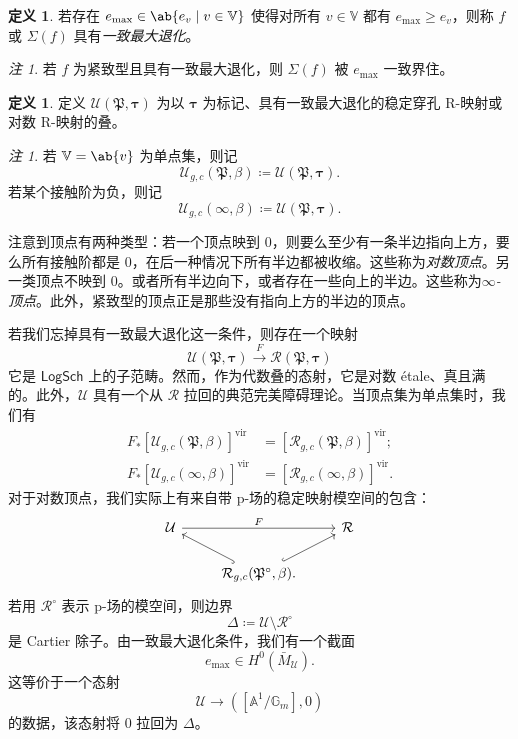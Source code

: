 \documentclass{amsart}
\theoremstyle{definition}
\newtheorem{defn}[thm]{定义}
\theoremstyle{remark}
\newtheorem{rmk}[thm]{注}
\theoremstyle{plain}
\theoremstyle{definition}
\theoremstyle{remark}
\newcommand{\A}{\mathbb{A}}
\newcommand{\G}{\mathbb{G}}
\newcommand{\V}{\mathbb{V}}
\newcommand{\mc}[1]{\mathcal{#1}}
\newcommand{\mf}[1]{\mathfrak{#1}}
\newcommand{\mr}[1]{\mathrm{#1}}
\newcommand{\ms}[1]{\mathsf{#1}}
\newcommand{\1}{\mathbf{1}}
\newcommand{\2}{\mathbf{2}}
\newcommand{\3}{\mathbf{3}}
\newcommand{\vir}{\mr{vir}}
\begin{document}
\begin{defn}
    若存在 \(e_{\max} \in \ab\{e_v \mid v \in \V \}\) 使得对所有 \(v \in \V\) 都有 \(e_{\max} \geq e_v\)，则称 \(f\) 或 \(\Sigma(f)\) 具有\textit{一致最大退化}。
\end{defn}

\begin{rmk}
    若 \(f\) 为紧致型且具有一致最大退化，则 \(\Sigma(f)\) 被 \(e_{\max}\) 一致界住。
\end{rmk}

\begin{defn}
    定义 \(\mc{U}(\mf{P}, \bm{\tau})\) 为以 \(\bm{\tau}\) 为标记、具有一致最大退化的稳定穿孔 R-映射或对数 R-映射的叠。
\end{defn}

\begin{rmk}
    若 \(\V = \ab\{v\}\) 为单点集，则记
    \[ \mc{U}_{g, c}(\mf{P}, \beta) \coloneqq \mc{U}(\mf{P}, \bm{\tau}). \]
    若某个接触阶为负，则记
    \[ \mc{U}_{g, c}(\infty, \beta) \coloneqq \mc{U}(\mf{P}, \bm{\tau}). \]
\end{rmk}

注意到顶点有两种类型：若一个顶点映到 \(0\)，则要么至少有一条半边指向上方，要么所有接触阶都是 \(0\)，在后一种情况下所有半边都被收缩。这些称为\textit{对数顶点}。另一类顶点不映到 \(0\)。或者所有半边向下，或者存在一些向上的半边。这些称为\textit{\(\infty\)-顶点}。此外，紧致型的顶点正是那些没有指向上方的半边的顶点。

若我们忘掉具有一致最大退化这一条件，则存在一个映射
\[ \mc{U}(\mf{P}, \bm{\tau}) \xrightarrow{F} \mc{R}(\mf{P}, \bm{\tau}) \]
它是 \(\ms{LogSch}\) 上的子范畴。然而，作为代数叠的态射，它是对数 \'etale、真且满的。此外，\(\mc{U}\) 具有一个从 \(\mc{R}\) 拉回的典范完美障碍理论。当顶点集为单点集时，我们有
\begin{align*}
    F_* [\mc{U}_{g, c}(\mf{P}, \beta)]^{\vir} &= [\mc{R}_{g, c}(\mf{P}, \beta)]^{\vir}; \\
    F_* [\mc{U}_{g, c}(\infty, \beta)]^{\vir} &= [\mc{R}_{g, c}(\infty, \beta)]^{\vir}.
\end{align*}
对于对数顶点，我们实际上有来自带 p-场的稳定映射模空间的包含：
\begin{equation*}
\begin{tikzcd}
    \mc{U} \ar{rr}{F} & & \mc{R} \\
    & \mc{R}_{g,c}(\mf{P}^{\circ}, \beta) \ar[hookrightarrow]{ul} \ar[hookrightarrow]{ur}.
\end{tikzcd}
\end{equation*}
若用 \(\mc{R}^{\circ}\) 表示 p-场的模空间，则边界
\[ \Delta \coloneqq \mc{U} \setminus \mc{R}^{\circ} \]
是 Cartier 除子。由一致最大退化条件，我们有一个截面
\[ e_{\max} \in H^0(\bar{M}_{\mc{U}}). \]
这等价于一个态射
\[ \mc{U} \to ([\A^1/\G_m], 0) \]
的数据，该态射将 \(0\) 拉回为 \(\Delta\)。
\end{document}
